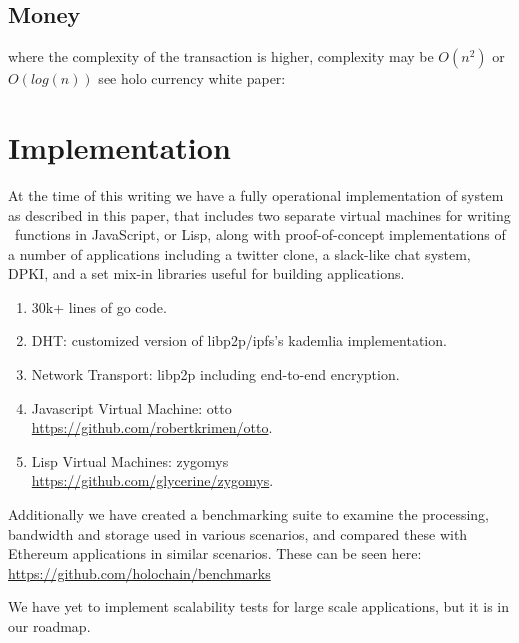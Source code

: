 \documentclass[twocolumn,showpacs,%
  nofootinbib,aps,superscriptaddress,%
  eqsecnum,prd,notitlepage,showkeys,10pt]{revtex4-1}
\begin{document}
\subsection{Money}
where the complexity of the transaction is higher, complexity may be $O(n^2)$ or $O(log(n))$ see holo currency white paper: \cite{holocurrency}


\section{Implementation}
\label{sec:implementation}

At the time of this writing we have a fully operational implementation of system as described in this paper, that includes two separate virtual machines for writing \hcdna\ functions in JavaScript, or Lisp, along with proof-of-concept implementations of a number of applications including a twitter clone, a slack-like chat system, DPKI, and a set mix-in libraries useful for building applications.

\begin{enumerate}
\item 30k+ lines of go code.
\item DHT: customized version of libp2p/ipfs's kademlia implementation.
\item Network Transport: libp2p including end-to-end encryption.
\item Javascript Virtual Machine: otto \\\url{https://github.com/robertkrimen/otto}.
\item Lisp Virtual Machines: zygomys \\\url{https://github.com/glycerine/zygomys}.
\end{enumerate}

Additionally we have created a benchmarking suite to examine the processing, bandwidth and storage used in various scenarios, and compared these with Ethereum applications in similar scenarios.  These can be seen here: \\\url{https://github.com/holochain/benchmarks}

We have yet to implement scalability tests for large scale applications, but it is in our roadmap.

\appendix
\end{document}
